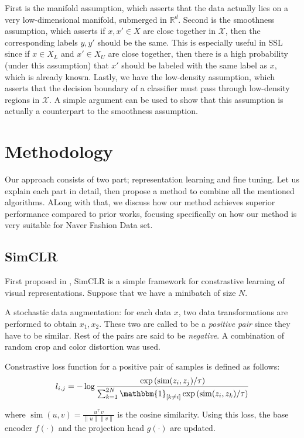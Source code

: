 \documentclass[10pt,twocolumn,letterpaper]{article}
\DeclareMathOperator{\similar}{\mathrm{sim}}
\begin{document}
First is the manifold assumption, which asserts that the data actually lies on a very low-dimensional manifold, submerged in $\mathbb{R}^d$.
Second is the smoothness assumption, which asserts if $x, x' \in X$ are close together in $\mathcal{X}$, then the corresponding labels $y, y'$ should be the same.
This is especially useful in SSL since if $x \in X_L$ and $x' \in X_U$ are close together, then there is a high probability (under this assumption) that $x'$ should be labeled with the same label as $x$, which is already known.
Lastly, we have the low-density assumption, which asserts that the decision boundary of a classifier must pass through low-density regions in $\mathcal{X}$.
A simple argument\cite{EH20} can be used to show that this assumption is actually a counterpart to the smoothness assumption.


\section{Methodology}
Our approach consists of two part; representation learning and fine tuning.
Let us explain each part in detail, then propose a method to combine all the mentioned algorithms.
ALong with that, we discuss how our method achieves superior performance compared to prior works, focusing specifically on how our method is very suitable for Naver Fashion Data set.


\subsection{SimCLR}
First proposed in \cite{CKNH20}, SimCLR is a simple framework for constrastive learning of visual representations.
Suppose that we have a minibatch of size $N$.

A stochastic data augmentation: for each data $x$, two data transformations are performed to obtain $x_1, x_2$.
These two are called to be a {\it positive pair} since they have to be similar.
Rest of the pairs are said to be {\it negative}.
A combination of random crop and color distortion was used.

Constrastive loss function for a positive pair of samples is defined as follows:
\[ l_{i,j} = -\log \frac{\exp\left(\similar(z_i, z_j) / \tau\right)}{\sum_{k=1}^{2N} \mathbbm{1}_{[k \not= i]} \exp\left( \similar(z_i, z_k) / \tau \right)} \]

where $\similar(u, v) = \frac{u^\intercal v}{\lVert u \rVert \lVert v \rVert}$ is the cosine similarity.
Using this loss, the base encoder $f(\cdot)$ and the projection head $g(\cdot)$ are updated.
\end{document}

